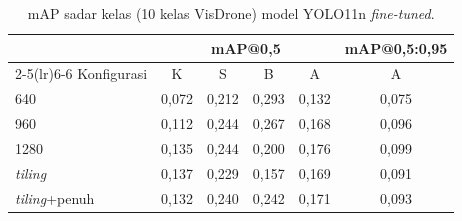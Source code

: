 \begin{table}[t]
\caption{mAP sadar kelas (10 kelas VisDrone) model YOLO11n \textit{fine-tuned}.}
\label{tab:map10}
\centering\scriptsize
\begin{tabular}{lccccc}
\toprule
 & \multicolumn{4}{c}{mAP@0,5} & mAP@0,5:0,95 \\
\cmidrule(lr){2-5}\cmidrule(lr){6-6}
Konfigurasi & K & S & B & A & A \\
\midrule
640 & 0,072 & 0,212 & 0,293 & 0,132 & 0,075 \\
960 & 0,112 & 0,244 & 0,267 & 0,168 & 0,096 \\
1280 & 0,135 & 0,244 & 0,200 & 0,176 & 0,099 \\
\textit{tiling} & 0,137 & 0,229 & 0,157 & 0,169 & 0,091 \\
\textit{\textit{tiling}}+penuh & 0,132 & 0,240 & 0,242 & 0,171 & 0,093 \\
\bottomrule
\end{tabular}
\end{table}
